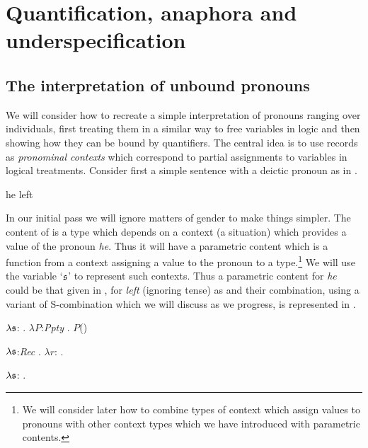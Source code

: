 \chapter{Quantification, anaphora and underspecification}
\label{ch:quant}
\setcounter{equation}{0}

\section{The interpretation of unbound pronouns}
We will consider how to recreate a simple interpretation of pronouns
ranging over individuals, first treating them in a similar way to free
variables in logic and then showing how they can be bound by
quantifiers.  The central idea is to use records as \textit{pronominal
  contexts} which correspond to partial assignments to variables in
logical treatments.  Consider first a simple sentence with a deictic
pronoun as in \nexteg{}.
\begin{ex} 
he left 
\end{ex} 
In our initial pass we will ignore matters
of gender to make things simpler.  The content of \preveg{} is a type
which depends on a context (a situation) which provides a value of the
pronoun \textit{he}. Thus it will have a parametric content which is a
function from a context assigning a value to the pronoun to a
type.\footnote{We will consider later how to combine types of context
  which assign values to pronouns with other context types which we
  have introduced with parametric contents.}  We will use the variable
`$\frak{s}$' to represent such contexts.  Thus a parametric content for
\textit{he} could be that given in , for \textit{left}
(ignoring tense) as  and their combination, using a variant
of S-combination which we will discuss as we progress, is represented
in .
\begin{ex} 
\begin{subex} 
 
\item $\lambda\frak{s}$: . 
        $\lambda P$:\textit{Ppty} . $P$()
 
\item $\lambda\frak{s}$:\textit{Rec} . 
        $\lambda r$: . 

\item $\lambda\frak{s}$:
  . 
 
\end{subex} 
   
\end{ex}
